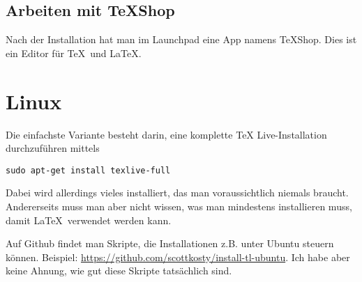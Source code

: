 \subsection*{Arbeiten mit TeXShop}

Nach der Installation hat man im Launchpad eine App namens TeXShop. Dies
ist ein Editor für \TeX\ und \LaTeX.

\section{Linux}

Die einfachste Variante besteht darin, eine komplette \TeX
Live-Installation durchzuführen mittels

\begin{lstlisting}
sudo apt-get install texlive-full
\end{lstlisting}

Dabei wird allerdings vieles installiert, das man voraussichtlich
niemals braucht. Andererseits muss man aber nicht wissen, was man
mindestens installieren muss, damit \LaTeX\ verwendet werden kann.

Auf Github findet man Skripte, die Installationen z.B. unter Ubuntu
steuern können. Beispiel:
\url{https://github.com/scottkosty/install-tl-ubuntu}. Ich habe aber
keine Ahnung, wie gut diese Skripte tatsächlich sind.

